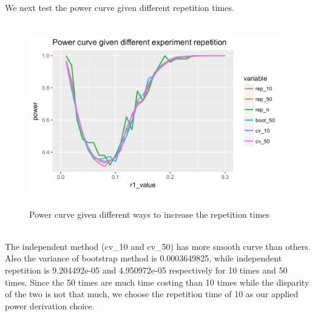 \documentclass[10pt,english]{article}\usepackage{graphicx, color}
\numberwithin{equation}{section}
\numberwithin{figure}{section}
\begin{document}
We next test the power curve given different repetition times.
\begin{figure}[htbp] 
\centering\includegraphics[width=11cm,height=8cm]{line}
\caption{Power curve given different ways to increase the repetition times}
\end{figure}
\quad\\
The independent method (cv\_10 and cv\_50) has more smooth curve than others. Also the variance of bootstrap method is 0.0003649825, while independent repetition is 9.204492e-05  and 4.950972e-05 respectively for 10 times and 50 times. Since the 50 times are much time costing than 10 times while the disparity of the two is not that much, we choose the repetition time of 10 as our applied power derivation choice.
\end{document}
